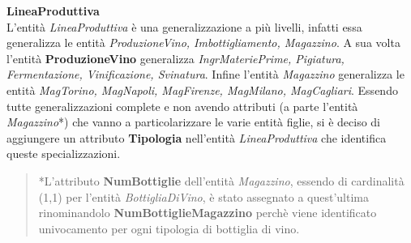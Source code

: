 \begin{flushleft}
	\textbf{\large{LineaProduttiva}}\\
	L'entità \emph{LineaProduttiva} è una generalizzazione a più livelli, infatti essa generalizza le entità \emph{ProduzioneVino, Imbottigliamento, Magazzino}. A sua volta l'entità \textbf{ProduzioneVino} generalizza \emph{IngrMateriePrime, Pigiatura, Fermentazione, Vinificazione, Svinatura}. Infine l'entità \emph{Magazzino} generalizza le entità \emph{MagTorino, MagNapoli, MagFirenze, MagMilano, MagCagliari}. Essendo tutte generalizzazioni complete e non avendo attributi (a parte l'entità \emph{Magazzino}*) che vanno a particolarizzare le varie entità figlie, si è deciso di aggiungere un attributo \textbf{Tipologia} nell'entità \emph{LineaProduttiva} che identifica queste specializzazioni.
\end{flushleft}

\begin{verse}
	*L'attributo \textbf{NumBottiglie} dell'entità \emph{Magazzino}, essendo di cardinalità (1,1) per l'entità \emph{BottigliaDiVino}, è stato assegnato a quest'ultima rinominandolo \textbf{NumBottiglieMagazzino} perchè viene identificato univocamento per ogni tipologia di bottiglia di vino.
\end{verse}